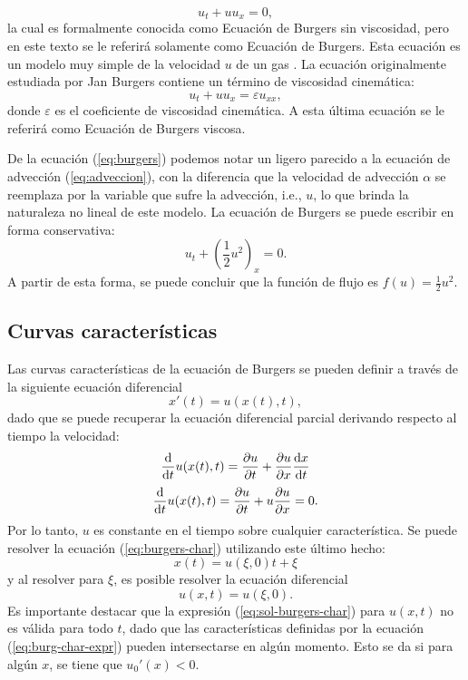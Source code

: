 \begin{equation}
	u_t + u u_x = 0,
	\label{eq:burgers}
\end{equation}
la cual es formalmente conocida como Ecuación de Burgers sin viscosidad, pero en este texto se le referirá solamente como Ecuación de Burgers. Esta ecuación es un modelo muy simple de la velocidad $u$ de un gas \cite{Cameron}. La ecuación originalmente estudiada por Jan Burgers contiene un término de viscosidad cinemática:
\begin{equation}
	u_t + u u_x = \varepsilon u_{xx},
	\label{eq:burgers-vis}
\end{equation}
donde $\varepsilon$ es el coeficiente de viscosidad cinemática. A esta última ecuación se le referirá como Ecuación de Burgers viscosa.

De la ecuación (\ref{eq:burgers}) podemos notar un ligero parecido a la ecuación de advección (\ref{eq:adveccion}), con la diferencia que la velocidad de advección $\alpha$ se reemplaza por la variable que sufre la advección, i.e., $u$, lo que brinda la naturaleza no lineal de este modelo. La ecuación de Burgers se puede escribir en forma conservativa:
\begin{equation}
	u_t + \left(\frac{1}{2}u^{2}\right)_x = 0.
	\label{eq:burgers-cons}
\end{equation}
A partir de esta forma, se puede concluir que la función de flujo es $f(u) = \frac{1}{2}u^{2}$.
\subsection{Curvas características}
Las curvas características de la ecuación de Burgers se pueden definir a través de la siguiente ecuación diferencial
\begin{equation}
	x'(t) = u(x(t),t),
	\label{eq:burgers-char}
\end{equation}
dado que se puede recuperar la ecuación diferencial parcial derivando respecto al tiempo la velocidad:
\begin{equation}
	\dv{t} u(x(t),t) = \pdv{u}{t} + \pdv{u}{x} \dv{x}{t}
\end{equation}
\begin{equation}
	\dv{t} u(x(t),t) = \pdv{u}{t} + u\pdv{u}{x} = 0.
\end{equation}
Por lo tanto, $u$ es constante en el tiempo sobre cualquier característica. Se puede resolver la ecuación (\ref{eq:burgers-char}) utilizando este último hecho:
\begin{equation}
	x(t) = u(\xi,0)t + \xi
	\label{eq:burg-char-expr}
\end{equation}
y al resolver para $\xi$, es posible resolver la ecuación diferencial
\begin{equation}
	u(x,t) = u(\xi, 0).
	\label{eq:sol-burgers-char}
\end{equation}
Es importante destacar que la expresión (\ref{eq:sol-burgers-char}) para $u(x,t)$ no es válida para todo $t$, dado que las características definidas por la ecuación (\ref{eq:burg-char-expr}) pueden intersectarse en algún momento. Esto se da si para algún $x$, se tiene que $u_0'(x) < 0$. 

